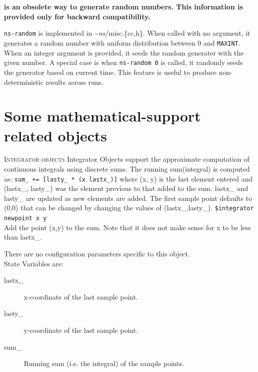 \section{}

{\bf {} is an obsolete way to generate random numbers. 
This information is provided only for backward compatibility.}

{\tt ns-random} is implemented in \textasciitilde\emph{ns}/{misc.\{cc,h\}}. 
When called with no argument, it generates a random number with
uniform distribution between 0 and {\tt MAXINT}.
When an integer argument is provided, it seeds the random generater
with the given number.
A special case is when {\tt ns-random 0} is called, it randomly seeds
the generator based on current time.
This feature is useful to produce non-deterministic results across
runs.

\section{Some mathematical-support related objects}
\label{sec:mathobjects}

\textsc{Integrator objects}
Integrator Objects support the approximate computation of continuous
integrals using discrete sums. The running sum(integral) is computed as:
{\tt sum\_ += [lasty\_ * (x lastx\_)]} where (x, y) is the last element
entered and
(lastx\_, lasty\_) was the element previous to that added to the sum.
lastx\_ and lasty\_ are updated as new elements are added. The first
sample point defaults to (0,0) that can be changed by changing the values
of (lastx\_,lasty\_). 
{\tt \$integrator newpoint \<x\> \<y\>}\\ %
Add the point (x,y) to the sum. Note that it does not make sense for x to
be less than lastx\_. 

There are no configuration parameters specific to this object. \\

State Variables are:
\begin{description}
\item[lastx\_]
x-coordinate of the last sample point. 

\item[lasty\_]
y-coordinate of the last sample point. 

\item[sum\_] Running sum (i.e. the integral) of the sample points. 
\end{description}


